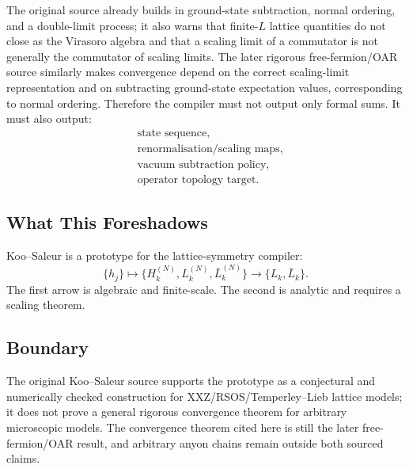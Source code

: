 The original source already builds in ground-state subtraction, normal ordering,
and a double-limit process; it also warns that finite-\(L\) lattice quantities
do not close as the Virasoro algebra and that a scaling limit of a commutator is
not generally the commutator of scaling limits.  The later rigorous
free-fermion/OAR source similarly makes convergence depend on the correct
scaling-limit representation and on subtracting ground-state expectation values,
corresponding to normal ordering.  Therefore the compiler must not output only
formal sums.  It must also output:
\[
\begin{array}{ll}
  &\text{state sequence},\\
  &\text{renormalisation/scaling maps},\\
  &\text{vacuum subtraction policy},\\
  &\text{operator topology target}.
\end{array}
\]

\subsection{What This Foreshadows}

Koo--Saleur is a prototype for the lattice-symmetry compiler:
\[
  \{h_j\} \longmapsto
  \{H_k^{(N)},L_k^{(N)},\bar L_k^{(N)}\}
  \longrightarrow
  \{L_k,\bar L_k\}.
\]
The first arrow is algebraic and finite-scale.  The second is analytic and
requires a scaling theorem.

\subsection{Boundary}

The original Koo--Saleur source supports the prototype as a conjectural and
numerically checked construction for XXZ/RSOS/Temperley--Lieb lattice models; it
does not prove a general rigorous convergence theorem for arbitrary microscopic
models.  The convergence theorem cited here is still the later
free-fermion/OAR result, and arbitrary anyon chains remain outside both sourced
claims.
